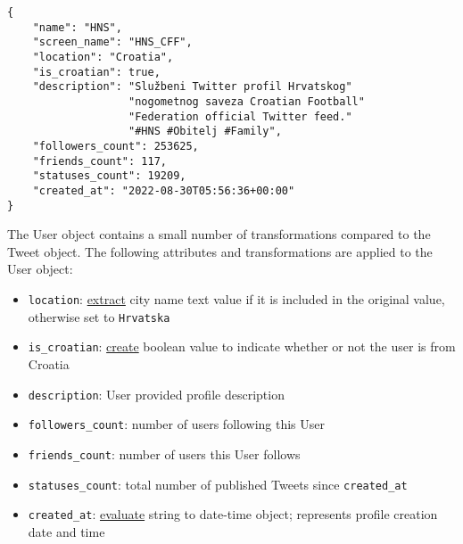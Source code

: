 \begin{code}
\label{subsubsec:sdlc-analysis-data-transformations:transform-user}
\begin{verbatim}
{
    "name": "HNS",
    "screen_name": "HNS_CFF",
    "location": "Croatia",
    "is_croatian": true,
    "description": "Službeni Twitter profil Hrvatskog"
                   "nogometnog saveza Croatian Football"
                   "Federation official Twitter feed."
                   "#HNS #Obitelj #Family",
    "followers_count": 253625,
    "friends_count": 117,
    "statuses_count": 19209,
    "created_at": "2022-08-30T05:56:36+00:00"
}
\end{verbatim}
\end{code}

The User object contains a small number of transformations compared to the Tweet object. The following attributes and transformations are applied to the User object:

\begin{itemize}
    \item \texttt{location}: \underline{extract} city name text value if it is included in the original value, otherwise set to \texttt{Hrvatska}
    \item \texttt{is\_croatian}: \underline{create} boolean value to indicate whether or not the user is from Croatia 
    \item \texttt{description}: User provided profile description
    \item \texttt{followers\_count}: number of users following this User
    \item \texttt{friends\_count}: number of users this User follows
    \item \texttt{statuses\_count}: total number of published Tweets since \texttt{created\_at}
    \item \texttt{created\_at}: \underline{evaluate} string to date-time object; represents profile creation date and time
\end{itemize}